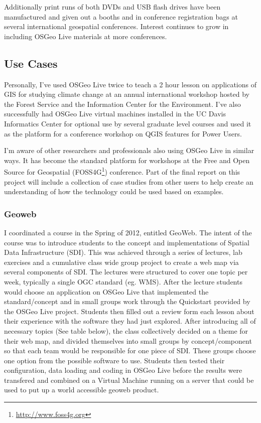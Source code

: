\documentclass[12pt,letterpaper]{article}
\begin{document}
Additionally print runs of both DVDs and USB flash drives have been manufactured and given out a booths and in conference registration bags at several international geospatial conferences. Interest continues to grow in including OSGeo Live materials at more conferences.

\subsection{Use Cases}
Personally, I've used OSGeo Live twice to teach a 2 hour lesson on applications of GIS for studying climate change at an annual international workshop hosted by the Forest Service and the Information Center for the Environment. I've also successfully had OSGeo Live virtual machines installed in the UC Davis Informatics Center for optional use by several graduate level courses and used it as the platform for a conference workshop on QGIS features for Power Users.

I'm aware of other researchers and professionals also using OSGeo Live in similar ways. It has become the standard platform for workshops at the Free and Open Source for Geospatial (FOSS4G\footnote{\url{http://www.foss4g.org}}) conference.  Part of the final report on this project will include a collection of  case studies from other users to help create an understanding of how the technology could be used based on examples. 

\subsubsection{Geoweb}
I coordinated a course in the Spring of 2012, entitled GeoWeb. The intent of the course was to introduce students to the concept and implementations of Spatial Data Infrastructure (SDI). This was achieved through a series of lectures, lab exercises and a cumulative class wide group project to create a web map via several components of SDI. The lectures were structured to cover one topic per week, typically a single OGC standard (eg. WMS). After the lecture students would choose an application on OSGeo Live that implemented the standard/concept and in small groups work through the Quickstart provided by the OSGeo Live project. Students then filled out a review form each lesson about their experience with the software they had just explored. After introducing all of necessary topics (See table below), the class collectively decided on a theme for their web map, and divided themselves into small groups by concept/component so that each team would be responsible for one piece of SDI. These groups choose one option from the possible software to use. Students then tested their configuration, data loading and coding in OSGeo Live before the results were transfered and combined on a Virtual Machine running on a server that could be used to put up a world accessible geoweb product.
\end{document}
